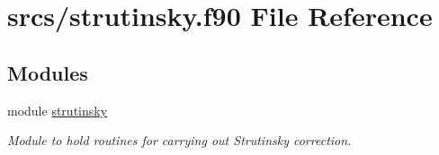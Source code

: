 \hypertarget{strutinsky_8f90}{}\section{srcs/strutinsky.f90 File Reference}
\label{strutinsky_8f90}
\subsection*{Modules}
\begin{DoxyCompactItemize}
\item 
module \mbox{\hyperlink{namespacestrutinsky}{strutinsky}}
\begin{DoxyCompactList}\small\item\em Module to hold routines for carrying out Strutinsky correction. \end{DoxyCompactList}\end{DoxyCompactItemize}
